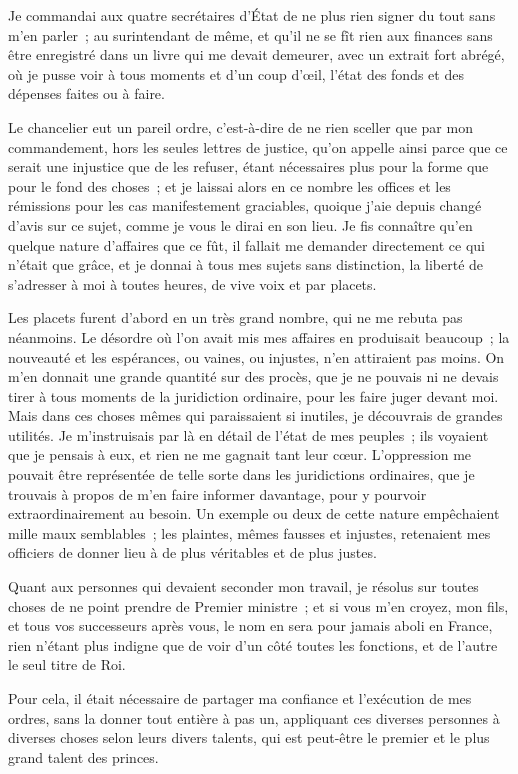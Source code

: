 \documentclass[french,twoside]{book} %
\begin{document}
Je commandai aux quatre secrétaires d’État de ne plus rien signer du tout sans m’en parler ; au surintendant de même, et qu’il ne se fît rien aux finances sans être enregistré dans un livre qui me devait demeurer, avec un extrait fort abrégé, où je pusse voir à tous moments et d’un coup d’œil, l’état des fonds et des dépenses faites ou à faire.\par
Le chancelier eut un pareil ordre, c’est-à-dire de ne rien sceller que par mon commandement, hors les seules lettres de justice, qu’on appelle ainsi parce que ce serait une injustice que de les refuser, étant nécessaires plus pour la forme que pour le fond des choses ; et je laissai alors en ce nombre les offices et les rémissions pour les cas manifestement graciables, quoique j’aie depuis changé d’avis sur ce sujet, comme je vous le dirai en son lieu. Je fis connaître qu’en quelque nature d’affaires que ce fût, il fallait me demander directement ce qui n’était que grâce, et je donnai à tous mes sujets sans distinction, la liberté de s’adresser à moi à toutes heures, de vive voix et par placets.\par
Les placets furent d’abord en un très grand nombre, qui ne me rebuta pas néanmoins. Le désordre où l’on avait mis mes affaires en produisait beaucoup ; la nouveauté et les espérances, ou vaines, ou injustes, n’en attiraient pas moins. On m’en donnait une grande quantité sur des procès, que je ne pouvais ni ne devais tirer à tous moments de la juridiction ordinaire, pour les faire juger devant moi. Mais dans ces choses mêmes qui paraissaient si inutiles, je découvrais de grandes utilités. Je m’instruisais par là en détail de l’état de mes peuples ; ils voyaient que je pensais à eux, et rien ne me gagnait tant leur cœur. L’oppression me pouvait être représentée de telle sorte dans les juridictions ordinaires, que je trouvais à propos de m’en faire informer davantage, pour y pourvoir extraordinairement au besoin. Un exemple ou deux de cette nature empêchaient mille maux semblables ; les plaintes, mêmes fausses et injustes, retenaient mes officiers de donner lieu à de plus véritables et de plus justes.\par
Quant aux personnes qui devaient seconder mon travail, je résolus sur toutes choses de ne point prendre de Premier ministre ; et si vous m’en croyez, mon fils, et tous vos successeurs après vous, le nom en sera pour jamais aboli en France, rien n’étant plus indigne que de voir d’un côté toutes les fonctions, et de l’autre le seul titre de Roi.\par
Pour cela, il était nécessaire de partager ma confiance et l’exécution de mes ordres, sans la donner tout entière à pas un, appliquant ces diverses personnes à diverses choses selon leurs divers talents, qui est peut-être le premier et le plus grand talent des princes.\par
\end{document}
